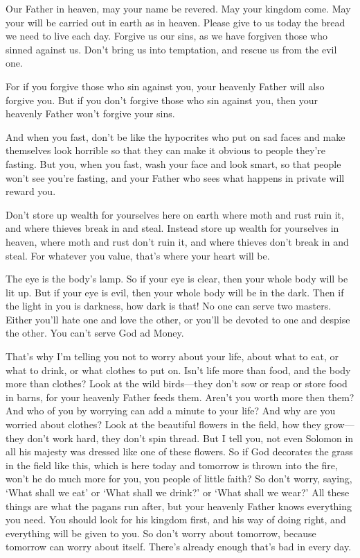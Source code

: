 \documentclass[a4paper]{amsbook}
\begin{document}
Our Father in heaven, may your name be revered. May your kingdom come. May your will be carried out in earth as in heaven. Please give to us today the bread we need to live each day. Forgive us our sins, as we have forgiven those who sinned against us. Don't bring us into temptation, and rescue us from the evil one.

For if you forgive those who sin against you, your heavenly Father will also forgive you. But if you don't forgive those who sin against you, then your heavenly Father won't forgive your sins.

And when you fast, don't be like the hypocrites who put on sad faces and make themselves look horrible so that they can make it obvious to people they're fasting. But you, when you fast, wash your face and look smart, so that people won't see you're fasting, and your Father who sees what happens in private will reward you.

Don't store up wealth for yourselves here on earth where moth and rust ruin it, and where thieves break in and steal. Instead store up wealth for yourselves in heaven, where moth and rust don't ruin it, and where thieves don't break in and steal. For whatever you value, that's where your heart will be.

The eye is the body's lamp. So if your eye is clear, then your whole body will be lit up. But if your eye is evil, then your whole body will be in the dark. Then if the light in you is darkness, how dark is that! No one can serve two masters. Either you'll hate one and love the other, or you'll be devoted to one and despise the other. You can't serve God ad Money.

That's why I'm telling you not to worry about your life, about what to eat, or what to drink, or what clothes to put on. Isn't life more than food, and the body more than clothes? Look at the wild birds—they don't sow or reap or store food in barns, for your heavenly Father feeds them. Aren't you worth more then them? And who of you by worrying can add a minute to your life? And why are you worried about clothes? Look at the beautiful flowers in the field, how they grow—they don't work hard, they don't spin thread. But I tell you, not even Solomon in all his majesty was dressed like one of these flowers. So if God decorates the grass in the field like this, which is here today and tomorrow is thrown into the fire, won't he do much more for you, you people of little faith? So don't worry, saying, ‘What shall we eat' or ‘What shall we drink?' or ‘What shall we wear?' All these things are what the pagans run after, but your heavenly Father knows everything you need. You should look for his kingdom first, and his way of doing right, and everything will be given to you. So don't worry about tomorrow, because tomorrow can worry about itself. There's already enough that's bad in every day.
\end{document}
